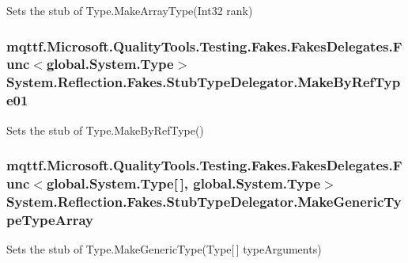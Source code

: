 Sets the stub of Type.\-Make\-Array\-Type(\-Int32 rank)

\hypertarget{class_system_1_1_reflection_1_1_fakes_1_1_stub_type_delegator_ab90debb0c2b7be021a05bd7c41539ea5}{
\subsubsection[{Make\-By\-Ref\-Type01}]{\setlength{\rightskip}{0pt plus 5cm}mqttf.\-Microsoft.\-Quality\-Tools.\-Testing.\-Fakes.\-Fakes\-Delegates.\-Func$<$global.\-System.\-Type$>$ System.\-Reflection.\-Fakes.\-Stub\-Type\-Delegator.\-Make\-By\-Ref\-Type01}}\label{class_system_1_1_reflection_1_1_fakes_1_1_stub_type_delegator_ab90debb0c2b7be021a05bd7c41539ea5}


Sets the stub of Type.\-Make\-By\-Ref\-Type()

\hypertarget{class_system_1_1_reflection_1_1_fakes_1_1_stub_type_delegator_adc8d29f4e8c073be9bdfd4987862f20c}{
\subsubsection[{Make\-Generic\-Type\-Type\-Array}]{\setlength{\rightskip}{0pt plus 5cm}mqttf.\-Microsoft.\-Quality\-Tools.\-Testing.\-Fakes.\-Fakes\-Delegates.\-Func$<$global.\-System.\-Type\mbox{[}$\,$\mbox{]}, global.\-System.\-Type$>$ System.\-Reflection.\-Fakes.\-Stub\-Type\-Delegator.\-Make\-Generic\-Type\-Type\-Array}}\label{class_system_1_1_reflection_1_1_fakes_1_1_stub_type_delegator_adc8d29f4e8c073be9bdfd4987862f20c}


Sets the stub of Type.\-Make\-Generic\-Type(\-Type\mbox{[}$\,$\mbox{]} type\-Arguments)

